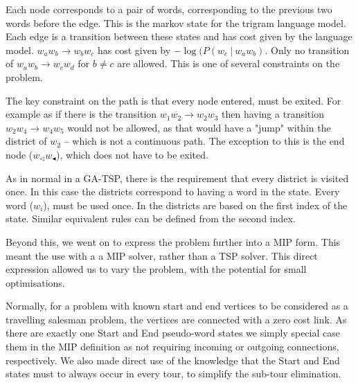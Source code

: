 \documentclass[11pt]{article}
\theoremstyle{plain}
\theoremstyle{definition}
\begin{document}
Each node corresponds to a pair of words, corresponding to the previous two words before the edge. This is the markov state for the trigram language model. Each edge is a transition between these states and has cost given by the language model. $w_aw_b\to w_bw_c$ has cost given by $-\log(P(w_c\:|\:w_aw_b)$. Only no transition of $w_aw_b\to w_cw_d$ for $b\ne c$ are allowed. This is one of several constraints on the problem.

The key constraint on the path is that every node entered, must be exited. For example as if there is the transition $w_1w_2 \to w_2w_3$ then having a transition $w_2w_4\to w_4w_5$ would not be allowed, as that would have a "jump" within the district  of $w_2$ -- which is not a continuous path. The exception to this is the end node ($w_\triangleleft w_\blacktriangleleft$), which does not have to be exited.

As in normal in a GA-TSP, there is the requirement that every district is visited once. In this case the districts correspond to having a word in the state. Every word ($w_i$), must be used once. In  the districts are based on the first index of the state. Similar equivalent rules can be defined from the second index.
 
Beyond this, we went on to express the problem further into a MIP form. This meant the use with a a MIP solver, rather than a TSP solver. This direct expression allowed us to vary the problem, with the potential for small optimisations.



Normally, for a problem with known start and end vertices to be considered as a travelling salesman problem, the vertices are connected with a zero cost link. As there are exactly one Start and End pseudo-word states we simply special case them in the MIP definition as not requiring incoming or outgoing connections, respectively. We also made direct use of the knowledge that the Start and End states must to always occur in every tour, to simplify the sub-tour elimination. 
\end{document}

